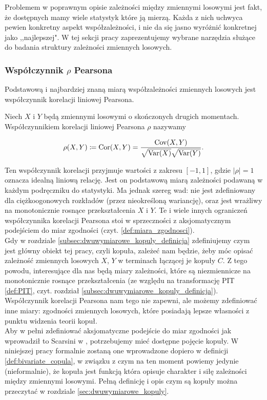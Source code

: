 Problemem w poprawnym opisie zależności między zmiennymi losowymi jest fakt, że dostępnych mamy wiele statystyk które ją mierzą. Każda z nich uchwyca pewien konkretny aspekt współzależności, i nie da się jasno wyróżnić konkretnej jako ,,najlepszej". W tej sekcji pracy zaprezentujemy wybrane narzędzia służące do badania struktury zależności zmiennych losowych.

\subsubsection{Współczynnik $\rho$ Pearsona}
Podstawową i najbardziej znaną miarą współzależności zmiennych losowych jest współczynnik korelacji liniowej Pearsona.

\begin{df}
	Niech $X$ i $Y$ będą zmiennymi losowymi o skończonych drugich momentach. Współczynnikiem korelacji liniowej Pearsona $\rho$ nazywamy
	
	$$ \rho(X, Y) \coloneqq \text{Cor}(X,Y) = \frac{\text{Cov}(X,Y)}{\sqrt{\text{Var}(X)}\sqrt{\text{Var}(Y)}}.$$
\end{df}

Ten współczynnik korelacji przyjmuje wartości z zakresu $[-1, 1]$, gdzie $\vert\rho\vert=1$ oznacza idealną liniową relację. Jest on podstawową miarą zależności podawaną w każdym podręczniku do statystyki. Ma jednak szereg wad: nie jest zdefiniowany dla ciężkoogonowych rozkładów (przez nieokreśloną wariancję), oraz jest wrażliwy na monotonicznie rosnące przekształcenia $X$ i $Y$. Te i wiele innych ograniczeń współczynnika korelacji Pearsona stoi w sprzeczności z aksjomatycznym podejściem do miar zgodności (czyt. \ref{def:miara_zgodnosci}). \\
Gdy w rozdziale \ref{subsec:dwuwymiarowe_kopuly_definicja} zdefiniujemy czym jest główny obiekt tej pracy, czyli kopuła, zależeć nam będzie, żeby móc opisać zależność zmiennych losowych $X$, $Y$ w terminach łączącej je kopuły $C$. Z tego powodu, interesujące dla nas będą miary zależności, które są niezmiennicze na monotonicznie rosnące przekształcenia (ze względu na transformację PIT \ref{def:PIT}, czyt. rozdział \ref{subsec:dwuwymiarowe_kopuly_definicja}). Współczynnik korelacji Pearsona nam tego nie zapewni, ale możemy zdefiniować inne miary: zgodności zmiennych losowych, które posiadają lepsze własności z punktu widzenia teorii kopuł.\\

Aby w pełni zdefiniować aksjomatyczne podejście do miar zgodności jak wprowadził to Scarsini w \cite{Scarsini1984}, potrzebujemy mieć dostępne pojęcie kopuły. W niniejszej pracy formalnie zostaną one wprowadzone dopiero w definicji \ref{def:bivariate_copula}, w związku z czym na ten moment powiemy jedynie (nieformalnie), że kopuła jest funkcją która opisuje charakter i siłę zależności między zmiennymi losowymi. Pełną definicję i opis czym są kopuły można przeczytać w rozdziale \ref{sec:dwuwymiarowe_kopuly}.

